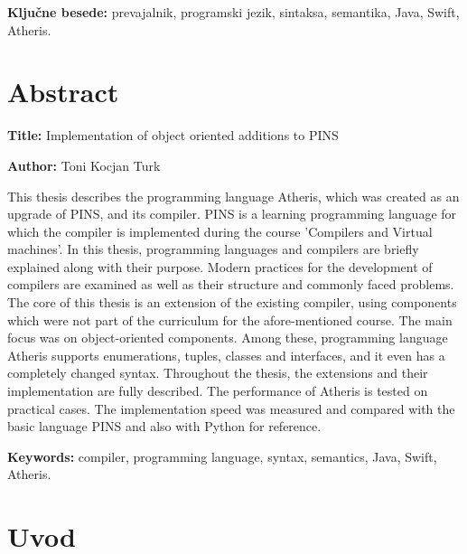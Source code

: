 \documentclass[a4paper, 12p]{book}
\newcommand{\ttitleEn}{Implementation of object oriented additions to PINS}
\newcommand{\tauthor}{Toni Kocjan Turk}
\newcommand{\tkeywords}{prevajalnik, programski jezik, sintaksa, semantika, Java, Swift, Atheris}
\newcommand{\tkeywordsEn}{compiler, programming language, syntax, semantics, Java, Swift, Atheris}
\newcommand{\clearemptydoublepage}{\newpage{\pagestyle{empty}\cleardoublepage}}
\begin{document}
\noindent 

\bigskip

\noindent\textbf{Ključne besede:} \tkeywords.
\clearemptydoublepage

\chapter*{Abstract}

\noindent\textbf{Title:} \ttitleEn
\bigskip

\noindent\textbf{Author:} \tauthor
\bigskip

\noindent This thesis describes the programming language Atheris, which was created as an upgrade of PINS, and its compiler. PINS is a learning programming language for which the compiler is implemented during the course 'Compilers and Virtual machines'. In this thesis, programming languages and compilers are briefly explained along with their purpose. Modern practices for the development of compilers are examined as well as their structure and commonly faced problems. The core of this thesis is an extension of the existing compiler, using components which were not part of the curriculum for the afore-mentioned course. The main focus was on object-oriented components. Among these, programming language Atheris supports enumerations, tuples, classes and interfaces, and it even has a completely changed syntax. Throughout the thesis, the extensions and their implementation are fully described.
The performance of Atheris is tested on practical cases. The implementation speed was measured and compared with the basic language PINS and also with Python for reference.
\bigskip

\noindent\textbf{Keywords:} \tkeywordsEn.
\clearemptydoublepage

\mainmatter
\setcounter{page}{1}
\pagestyle{fancy}

\chapter{Uvod}
\end{document}
